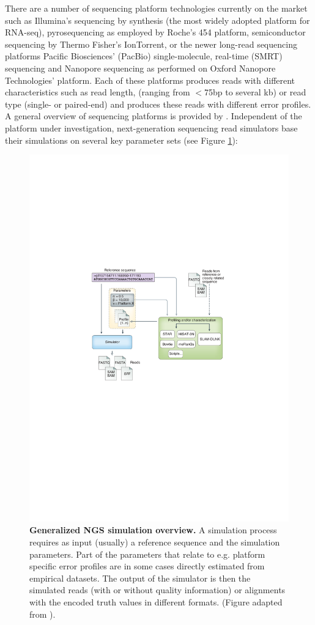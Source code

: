 There are a number of sequencing platform technologies currently on the market such as Illumina's sequencing by synthesis (the most widely adopted platform for RNA-seq), pyrosequencing as employed by Roche's 454 platform, semiconductor sequencing by Thermo Fisher's IonTorrent, or the newer long-read sequencing platforms Pacific Biosciences' (PacBio) single-molecule, real-time (SMRT) sequencing and Nanopore sequencing as performed on Oxford Nanopore Technologies' platform. Each of these platforms produces reads with different characteristics such as read length, (ranging from $<$75bp to several kb) or read type (single- or paired-end) and produces these reads with different error profiles. A general overview of sequencing platforms is provided by \citeauthor{Liu2012} \citep{Liu2012}. Independent of the platform under investigation, next-generation sequencing read simulators base their simulations on several key parameter sets (see Figure \ref{fig:simulator_overview}):

\begin{figure}[h]
	 \centering
	 \includegraphics[width=0.7\linewidth]{img/chapter1/simulator_overview}
	  \caption[Generalized NGS simulation overview]{\textbf{Generalized NGS simulation overview.} A simulation process requires as input (usually) a reference sequence and the simulation parameters. Part of the parameters that relate to e.g. platform specific error profiles are in some cases directly estimated from empirical datasets. The output of the simulator is then the simulated reads (with or without quality information) or alignments with the encoded truth values in different formats. (Figure adapted from \citeauthor{Escalona2016} \citep{Escalona2016}).}
	 \label{fig:simulator_overview}
\end{figure}

